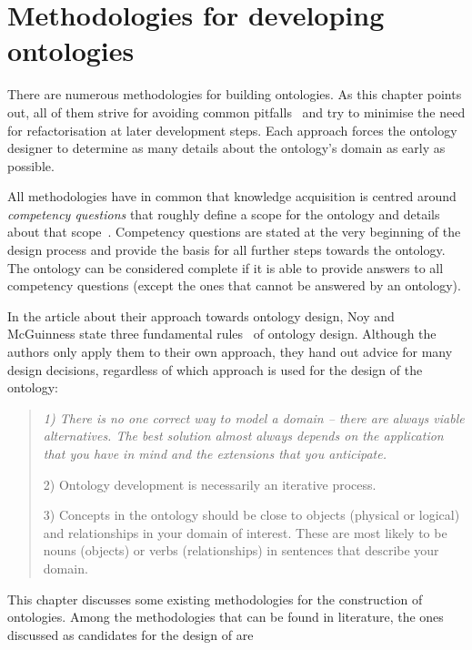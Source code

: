 \chapter{Methodologies for developing ontologies}
\label{ch:development_approaches}

There are numerous methodologies for building ontologies. As this chapter points out, all of them strive for avoiding common pitfalls~\cite{ontology_pitfalls} and try to minimise the need for refactorisation at later development steps. Each approach forces the ontology designer to determine as many details about the ontology's domain as early as possible.

All methodologies have in common that knowledge acquisition is centred around \emph{competency questions} that roughly define a scope for the ontology and details about that scope~\cite{competency_questions}. Competency questions are stated at the very beginning of the design process and provide the basis for all further steps towards the ontology. The ontology can be considered complete if it is able to provide answers to all competency questions (except the ones that cannot be answered by an ontology).

In the article about their approach towards ontology design, Noy and McGuinness state three fundamental rules~\cite{Ontology101} of ontology design. Although the authors only apply them to their own approach, they hand out advice for many design decisions, regardless of which approach is used for the design of the ontology:

\begin{quote}
\itshape
1) There is no one correct way to model a domain -- there are always viable alternatives. The best solution almost always depends on the application that you have in mind and the extensions that you anticipate.

2) Ontology development is necessarily an iterative process.

3) Concepts in the ontology should be close to objects (physical or logical) and relationships in your domain of interest. These are most likely to be nouns (objects) or verbs (relationships) in sentences that describe your domain.\normalfont~\cite{Ontology101}
\end{quote}

This chapter discusses some existing methodologies for the construction of ontologies. Among the methodologies that can be found in literature, the ones discussed as candidates for the design of \smarthomeweather are

